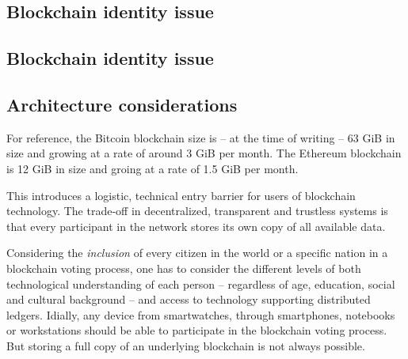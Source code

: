 \documentclass[9pt,oneside]{amsart}
\begin{document}
\begin{multicols}{2}
\subsection{Blockchain identity issue}

\subsection{Blockchain identity issue}

\subsection{Architecture considerations}
For reference, the Bitcoin blockchain size is -- at the time of writing -- 63 GiB in size and growing at a rate of around 3 GiB per month. The Ethereum blockchain is 12 GiB in size and groing at a rate of 1.5 GiB per month.\par
This introduces a logistic, technical entry barrier for users of blockchain technology. The trade-off in decentralized, transparent and trustless systems is that every participant in the network stores its own copy of all available data.\par
Considering the \textit{inclusion} of every citizen in the world or a specific nation in a blockchain voting process, one has to consider the different levels of both technological understanding of each person -- regardless of age, education, social and cultural background -- and access to technology supporting distributed ledgers. Idially, any device from smartwatches, through smartphones, notebooks or workstations should be able to participate in the blockchain voting process. But storing a full copy of an underlying blockchain is not always possible.

\end{multicols}
\end{document}
